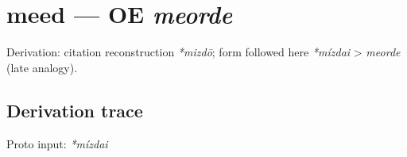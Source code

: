 \documentclass[
  british,
  a4paper,
  openany]{book}
\providecommand{\texorpdfstring}[2]{#1}
\begin{document}
\section{\texorpdfstring{meed --- OE
\emph{meorde}}{meed --- OE meorde}}\label{meed-oe-meorde}


Derivation: citation reconstruction \emph{*mizdō}; form followed here
\emph{*mízdai} \textgreater{} \emph{meorde} (late analogy).

\subsection{Derivation trace}\label{derivation-trace-119}

Proto input: \emph{*mízdai}

\begingroup
\setlength{\fboxsep}{6pt}
\end{document}
